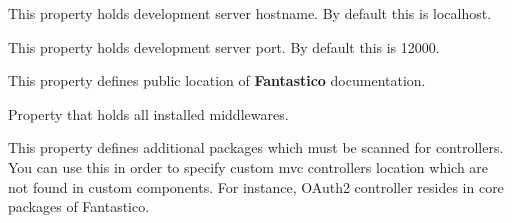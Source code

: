 \documentclass[letterpaper,10pt,english]{sphinxmanual}
\begin{document}
\begin{fulllineitems}
\begin{fulllineitems}
\label{get_started/settings:fantastico.settings.BasicSettings.dev_server_host}
This property holds development server hostname. By default this is localhost.

\end{fulllineitems}


\begin{fulllineitems}
\label{get_started/settings:fantastico.settings.BasicSettings.dev_server_port}
This property holds development server port. By default this is 12000.

\end{fulllineitems}


\begin{fulllineitems}
\label{get_started/settings:fantastico.settings.BasicSettings.doc_base}
This property defines public location of \textbf{Fantastico} documentation.

\end{fulllineitems}


\begin{fulllineitems}
\label{get_started/settings:fantastico.settings.BasicSettings.installed_middleware}
Property that holds all installed middlewares.

\end{fulllineitems}


\begin{fulllineitems}
\label{get_started/settings:fantastico.settings.BasicSettings.mvc_additional_paths}
This property defines additional packages which must be scanned for controllers. You can use this in order to specify
custom mvc controllers location which are not found in custom components. For instance, OAuth2 controller resides
in core packages of Fantastico.

\end{fulllineitems}


\end{fulllineitems}
\end{document}
